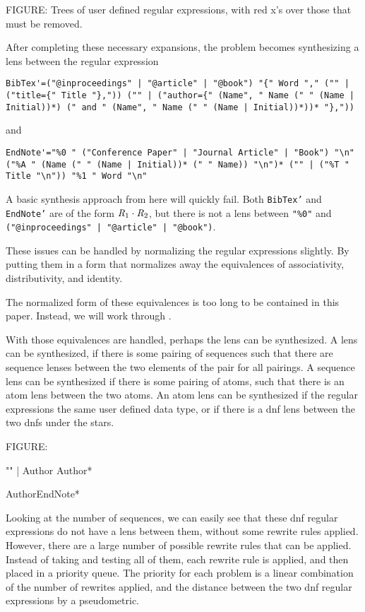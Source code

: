 FIGURE:
Trees of user defined regular expressions, with red x's over those that must be
removed.

After completing these necessary expansions, the problem becomes synthesizing a
lens between the regular expression
\begin{lstlisting}
BibTex'=("@inproceedings" | "@article" | "@book") "{" Word "," ("" | ("title={" Title "},")) ("" | ("author={" (Name", " Name (" " (Name | Initial))*) (" and " (Name", " Name (" " (Name | Initial))*))* "},"))
\end{lstlisting}
and
\begin{lstlisting}
EndNote'="%0 " ("Conference Paper" | "Journal Article" | "Book") "\n" ("%A " (Name (" " (Name | Initial))* (" " Name)) "\n")* ("" | ("%T " Title "\n")) "%1 " Word "\n"
\end{lstlisting}

A basic synthesis approach from here will quickly fail.  Both \texttt{BibTex'}
and \texttt{EndNote'} are of the form $\mathit{R}_1\cdot\mathit{R}_2$, but there is
not a lens between \texttt{"\%0"} and
\texttt{("@inproceedings" | "@article" | "@book")}.

These issues can be handled by normalizing the regular expressions slightly.
By putting them in a form that normalizes away the equivalences of
associativity, distributivity, and \EmptyString{} identity.

The normalized form of these equivalences is too long to be contained in this
paper.  Instead, we will work through .

With those equivalences are handled, perhaps the lens can be synthesized.
A lens can be synthesized, if there is some pairing of sequences such that
there are sequence lenses between the two elements of the pair for all pairings.
A sequence lens can be synthesized if there is some pairing of atoms, such that
there is an atom lens between the two atoms.  An atom lens can be synthesized
if the regular expressions the same user defined data type, or if there is a dnf
lens between the two dnfs under the stars.

FIGURE:

"" | Author Author*

AuthorEndNote*

Looking at the number of sequences, we can easily see that these dnf regular
expressions do not have a lens between them, without some rewrite rules applied.
However, there are a large number of possible rewrite rules that can be applied.
Instead of taking and testing all of them, each rewrite rule is applied, and
then placed in a priority queue.
The priority for each problem is a linear combination of the number of rewrites
applied, and the distance between the two dnf regular expressions by a
pseudometric.


